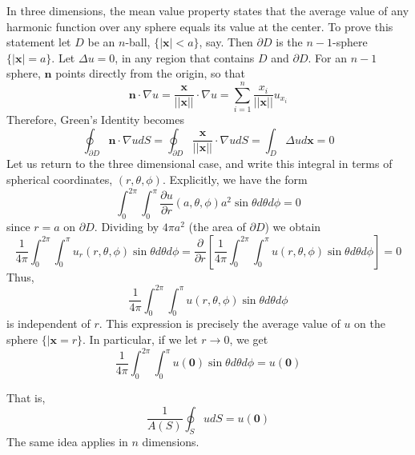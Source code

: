 \documentclass[12pt, a4paper, oneside, openright, titlepage]{book}
\begin{document}
In three dimensions, the mean value property states that the average value of any harmonic function over any sphere equals its value at the center. To prove this statement let $D$ be an $n$-ball, $\{|\mathbf{x}| < a\}$, say. Then $\partial D$ is the $n-1$-sphere $\{|\mathbf{x}| = a\}$. Let $\Delta u = 0$, in any region that contains $D$ and $\partial D$. For an $n-1$ sphere, $\mathbf{n}$ points directly from the origin, so that \begin{equation*}
    \mathbf{n}\cdot \nabla u = \frac{\mathbf{x}}{||\mathbf{x}||}\cdot \nabla u = \sum_{i=1}^n\frac{x_i}{||\mathbf{x}||}u_{x_i} 
\end{equation*}
Therefore, Green's Identity becomes \begin{equation*}
    \oint_{\partial D}\mathbf{n}\cdot\nabla udS = \oint_{\partial D}\frac{\mathbf{x}}{||\mathbf{x}||}\cdot \nabla udS = \int_{D}\Delta ud\mathbf{x} = 0
\end{equation*}
Let us return to the three dimensional case, and write this integral in terms of spherical coordinates, $(r,\theta,\phi)$. Explicitly, we have the form \begin{equation*}
    \int_0^{2\pi}\int_0^{\pi}\frac{\partial u}{\partial r}(a,\theta,\phi)a^2\sin\theta d\theta d\phi = 0
\end{equation*}
since $r = a$ on $\partial D$. Dividing by $4\pi a^2$ (the area of $\partial D$) we obtain \begin{equation*}
    \frac{1}{4\pi}\int_0^{2\pi}\int_0^{\pi}u_r(r,\theta,\phi)\sin\theta d\theta d\phi = \frac{\partial}{\partial r}\left[\frac{1}{4\pi}\int_0^{2\pi}\int_0^{\pi}u(r,\theta,\phi)\sin\theta d\theta d\phi\right] = 0
\end{equation*}
Thus, \begin{equation*}
    \frac{1}{4\pi}\int_0^{2\pi}\int_0^{\pi}u(r,\theta,\phi)\sin\theta d\theta d\phi
\end{equation*}
is independent of $r$. This expression is precisely the average value of $u$ on the sphere $\{|\mathbf{x}=r\}$. In particular, if we let $r\rightarrow 0$, we get \begin{equation*}
    \frac{1}{4\pi}\int_0^{2\pi}\int_0^{\pi}u(\mathbf{0})\sin\theta d\theta d\phi = u(\mathbf{0})
\end{equation*}

That is, \begin{equation}
    \boxed{\frac{1}{A(S)}\oint_SudS = u(\mathbf{0})}
\end{equation}
The same idea applies in $n$ dimensions.
\end{document}

